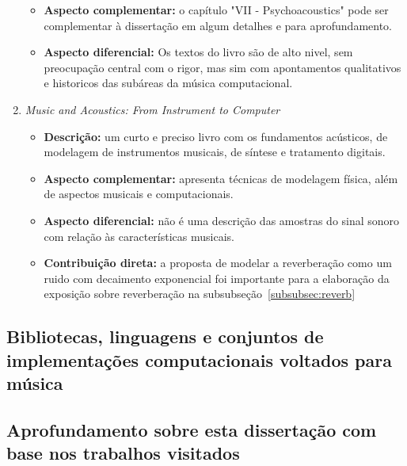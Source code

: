 \begin{enumerate}
\begin{itemize}
            \item {\bf Aspecto complementar:} o capítulo "VII - Psychoacoustics" pode ser complementar à dissertação em algum detalhes e para aprofundamento.
            \item {\bf Aspecto diferencial:} Os textos do livro são de alto nivel, sem preocupação central com o rigor, mas sim com apontamentos qualitativos e historicos das subáreas da música computacional. 
        \end{itemize}
    \item \emph{Music and Acoustics: From Instrument to Computer}
        \begin{itemize}
            \item {\bf Descrição:} um curto e preciso livro com os fundamentos acústicos, de modelagem de instrumentos musicais, de síntese e tratamento digitais.
            \item {\bf Aspecto complementar:} apresenta técnicas de modelagem física, além de aspectos musicais e computacionais.
            \item {\bf Aspecto diferencial:} não é uma descrição das amostras do sinal sonoro com relação às características musicais.
            \item {\bf Contribuição direta:} a proposta de modelar a reverberação como um ruido com decaimento exponencial foi importante para a elaboração da exposição sobre reverberação na subsubseção~\ref{subsubsec:reverb}
        \end{itemize}
\end{enumerate}

\subsection{Bibliotecas, linguagens e conjuntos de implementações computacionais voltados para música}

\subsection{Aprofundamento sobre esta dissertação com base nos trabalhos visitados}


